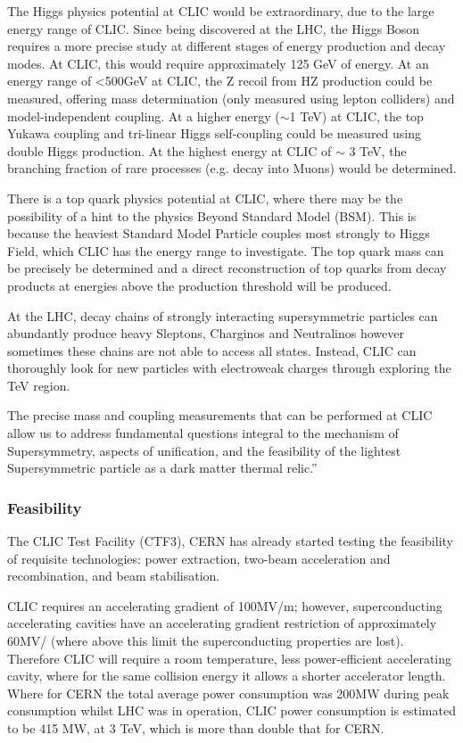 The Higgs physics potential at CLIC would be extraordinary, due to the large energy range of CLIC. Since being discovered at the LHC, the Higgs Boson requires a more precise study at different stages of energy production and decay modes. At CLIC, this would require approximately 125 GeV of energy. At an energy range of <500GeV at CLIC, the Z recoil from HZ production could be measured, offering mass determination (only measured using lepton colliders) and model-independent coupling. At a higher energy ($\sim$1 TeV) at CLIC, the top Yukawa coupling and tri-linear Higgs self-coupling could be measured using double Higgs production.
At the highest energy at CLIC of $\sim$ 3 TeV, the branching fraction of rare processes (e.g. decay into Muons) would be determined.
 
There is a top quark physics potential at CLIC, where there may be the possibility of a hint to the physics Beyond Standard Model (BSM). This is because the heaviest Standard Model Particle couples most strongly to Higgs Field, which CLIC has the energy range to investigate. The top quark mass can be precisely be determined and a direct reconstruction of top quarks from decay products at energies above the production threshold will be produced.
 
At the LHC, decay chains of strongly interacting supersymmetric particles can abundantly produce heavy Sleptons, Charginos and Neutralinos however sometimes these chains are not able to access all states. Instead, CLIC can thoroughly look for new particles with electroweak charges through exploring the TeV region. \cite{CLIC:Concept}

The precise mass and coupling measurements that can be performed at CLIC allow us to address fundamental questions integral to the mechanism of Supersymmetry, aspects of unification, and the feasibility of the lightest Supersymmetric particle as a dark matter thermal relic.” \cite{CLIC:Concept}
 
\subsubsection{Feasibility}

The CLIC Test Facility (CTF3), CERN has already started testing the feasibility of requisite technologies: power extraction, two-beam acceleration and recombination, and beam stabilisation. \cite{CLIC:DriveBeam}

CLIC requires an accelerating gradient of 100MV/m; however, superconducting accelerating cavities have an accelerating gradient restriction of approximately 60MV/ (where above this limit the superconducting properties are lost). Therefore CLIC will require a room temperature, less power-efficient accelerating cavity, where for the same collision energy it allows a shorter accelerator length. Where for CERN the total average power consumption was 200MW during peak consumption whilst LHC was in operation, CLIC power consumption is estimated to be 415 MW, at 3 TeV, which is more than double that for CERN. \cite{CERN:Powering}

